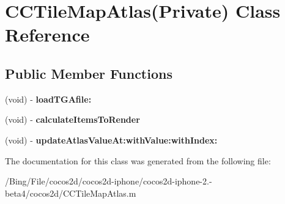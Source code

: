 \hypertarget{interface_c_c_tile_map_atlas_07_private_08}{\section{C\-C\-Tile\-Map\-Atlas(Private) Class Reference}
\label{interface_c_c_tile_map_atlas_07_private_08}
}
\subsection*{Public Member Functions}
\begin{DoxyCompactItemize}
\item 
\hypertarget{interface_c_c_tile_map_atlas_07_private_08_a56683de9de1ba9f566ede21b40184100}{(void) -\/ {\bfseries load\-T\-G\-Afile\-:}}\label{interface_c_c_tile_map_atlas_07_private_08_a56683de9de1ba9f566ede21b40184100}

\item 
\hypertarget{interface_c_c_tile_map_atlas_07_private_08_ad98b6ebf1ece704ca958a895bd619e5b}{(void) -\/ {\bfseries calculate\-Items\-To\-Render}}\label{interface_c_c_tile_map_atlas_07_private_08_ad98b6ebf1ece704ca958a895bd619e5b}

\item 
\hypertarget{interface_c_c_tile_map_atlas_07_private_08_acc91d6c0a0669947ba355a38cbce77eb}{(void) -\/ {\bfseries update\-Atlas\-Value\-At\-:with\-Value\-:with\-Index\-:}}\label{interface_c_c_tile_map_atlas_07_private_08_acc91d6c0a0669947ba355a38cbce77eb}

\end{DoxyCompactItemize}


The documentation for this class was generated from the following file\-:\begin{DoxyCompactItemize}
\item 
/\-Bing/\-File/cocos2d/cocos2d-\/iphone/cocos2d-\/iphone-\/2.-\/beta4/cocos2d/C\-C\-Tile\-Map\-Atlas.\-m\end{DoxyCompactItemize}

